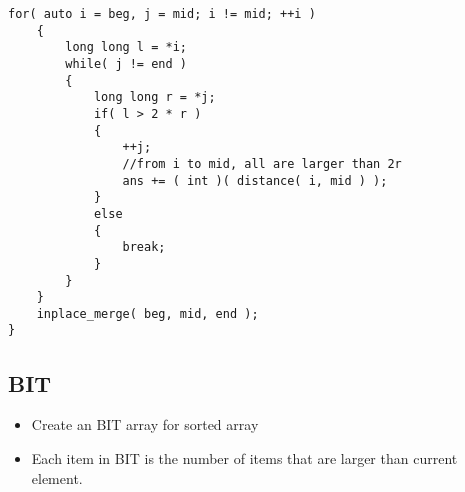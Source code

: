 \begin{lstlisting}[style=customc, caption={Merge Sort}]
    for( auto i = beg, j = mid; i != mid; ++i )
    {
        long long l = *i;
        while( j != end )
        {
            long long r = *j;
            if( l > 2 * r )
            {
                ++j;
                //from i to mid, all are larger than 2r
                ans += ( int )( distance( i, mid ) );
            }
            else
            {
                break;
            }
        }
    }
    inplace_merge( beg, mid, end );
}
\end{lstlisting}


\subsection{BIT}
\begin{itemize}
\item Create an BIT array for sorted array
\item Each item in BIT is the number of items that are larger than current element.
\end{itemize}


